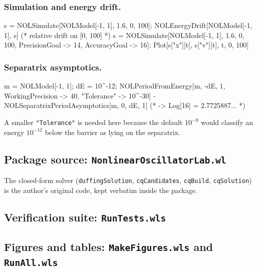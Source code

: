 \documentclass[11pt]{article}
\begin{document}
\subsubsection*{Simulation and energy drift.}
\begin{wlcode}
s = NOLSimulate[NOLModel[-1, 1], 1.6, 0, 100];
NOLEnergyDrift[NOLModel[-1, 1], s]                   (* relative drift on [0, 100] *)
s = NOLSimulate[NOLModel[-1, 1], 1.6, 0, 100, PrecisionGoal -> 14, AccuracyGoal -> 16];
Plot[{s["x"][t], s["v"][t]}, {t, 0, 100}]
\end{wlcode}

\subsubsection*{Separatrix asymptotics.}
\begin{wlcode}
m = NOLModel[-1, 1]; dE = 10^-12;
NOLPeriodFromEnergy[m, -dE, 1, WorkingPrecision -> 40, "Tolerance" -> 10^-30] -
  NOLSeparatrixPeriodAsymptotics[m, 0, dE, 1]        (* -> Log[16] = 2.7725887... *)
\end{wlcode}
A smaller \texttt{"Tolerance"} is needed here because the default $10^{-9}$ would classify an energy $10^{-12}$ below the barrier as lying on the separatrix.

\subsection{Package source: \texttt{NonlinearOscillatorLab.wl}}\label{app:src}
The closed-form solver (\texttt{duffingSolution}, \texttt{cqCandidates}, \texttt{cqBuild}, \texttt{cqSolution}) is the author's original code, kept verbatim inside the package.


\subsection{Verification suite: \texttt{RunTests.wls}}\label{app:tests}


\subsection{Figures and tables: \texttt{MakeFigures.wls} and \texttt{RunAll.wls}}\label{app:figs}


\end{document}
